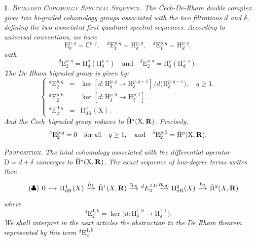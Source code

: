 \documentclass[12pt,reqno]{amsart}
\theoremstyle{article}
\newtheorem{article}{}
\def\artlabel[#1]{\textsc{#1}.}
\def \D{\mathrm D}
\def \E{\mathrm E}
\def \H{\mathrm H}
\def \X{\mathrm X}
\newcommand{\RR}{{\bf R}}
\newcommand{\sC}{\mathsf{C}}
\newcommand{\Cech}{\v{C}ech\ }
\newcommand{\dR}{\mathrm{dR}}
\newcommand{\exit}{\mathrm{out}}
\newcommand{\init}{\mathrm{in}}
\newcommand{\vH}{\check{\mathrm{H}}}
\def \H{\mathrm H}
\begin{document}
  \begin{article}\artlabel[Bigraded Cohomolgy Spectral Sequence]
    \label{Bigraded-Cohomolgy-Spectral-Sequence}
    The \v{C}ech-De-Rham double complex gives two bi-graded cohomology groups associated with the two filtrations $d$ and $\delta$,
    defining the two associated first quadrant spectral sequences.
    According to universal conventions,
    we have
    $$
    \E_0^{p,q} = \sC^{p,q},
    \quad ^d\E^{p,q}_1 = \H_\delta^{p,q},
    \quad ^\delta\E^{p,q}_1 = \H_d^{p,q},
    $$
    with
    $$
    ^d\E^{p,q}_2 = \H^q_d(\H^{p,\star}_\delta )
    \quad \text{and} \quad
    ^\delta\E^{p,q}_2 = \H^p_\delta(\H_d^{\star,q}).
    $$
    The \emph{De Rham bigraded group} is given by:
    $$
    \left\{
    \begin{array}{lcl}
      ^d\E^{p,q}_2 & = & \ker[d \colon \H^{p,q}_\delta \to \H^{p,q+1}_\delta]/ d\big( \H^{p,q-1}_\delta \big), \quad q \geq 1.  \\[.3ex]
      ^d\E^{p,0}_2 & = & \ker[d \colon \H^{p,0}_\delta \to \H^{p,1}_\delta].  \\[.3ex]
      ^d\E^{0,q}_2 & = & \H_\dR^q(\X).
    \end{array}
    \right .
    $$
    And the \emph{\Cech bigraded group} reduces to $\vH^\star(\X,\RR)$.
    Precisely,
    $$
    ^\delta\E^{p,q}_2 = 0
    \quad \text{for all} \quad q \geq 1,
    \quad \text{and} \quad
    ^\delta\E^{p,0}_2  =  \vH^p(\X,\RR).
    $$
    
    \textsc{Proposition.} {\it The total cohomology associated with the differential operator $\D = d + \delta$ converges to $\vH^\star(\X,\RR)$.
    The exact sequence of low-degree terms writes then
    \begin{equation}\tag{$\clubsuit$}
      \begin{tikzcd}[column sep=1.2em,every label/.append style = {font = \small}]
        0 \arrow[rightarrow]{r} & \H^{1}_\dR(X) \arrow[r, "h_1"] & \vH^{1}(X,\RR) \arrow[r, "\eta_\init"] & {}^dE^{1,0}_2 \arrow[r, "\eta_\exit"] & \H^{2}_\dR(X) \arrow[r, "h_2"]  & \vH^{2}(X,\RR)
      \end{tikzcd}
    \end{equation}
    where
    $$
    {}^d\E^{1,0}_2=\ker\big(d \colon \H^{1,0}_\delta  \rightarrow \H^{1,1}_\delta \big).
    $$
    }
    We shall interpret in the next articles the obstruction to the De Rham theorem represented by this term ${}^d\E^{1,0}_2$.
  \end{article}
  
\end{document}
